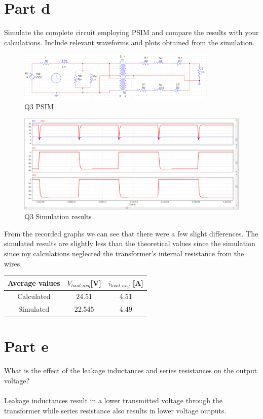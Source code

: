 \documentclass{article}
\begin{document}
\section*{Part d}
Simulate the complete circuit employing PSIM and compare the results with your calculations. Include relevant waveforms and plots obtained from the simulation.
\begin{figure}[H]
    \centering
    \includegraphics[width=0.85\textwidth]{q3d.png}
    \caption{Q3 PSIM}
\end{figure}
\begin{figure}[H]
    \centering
    \includegraphics[width=1\textwidth]{q3d-f.png}
    \caption{Q3 Simulation results}
\end{figure}
From the recorded graphs we can see that there were a few slight differences. The simulated results are slightly less than the theoretical values since the simulation since my calculations neglected the transformer's internal resistance from the wires.
\begin{center}
    \begin{tabular}{|c | c c ||} 
    \hline
    Average values & $V_{load, avg}$[V]& $i_{load,avg}$ [A]\\
    \hline\hline
    Calculated & 24.51 & 4.51 \\
    \hline
    Simulated & 22.545 & 4.49 \\
    [1ex] 
    \hline
    \end{tabular}
\end{center}

\section*{Part e}
What is the effect of the leakage inductances and series resistances on the output voltage?\\
\\Leakage inductances result in a lower transmitted voltage through the transformer while series resistance also results in lower voltage outputs.
\end{document}
